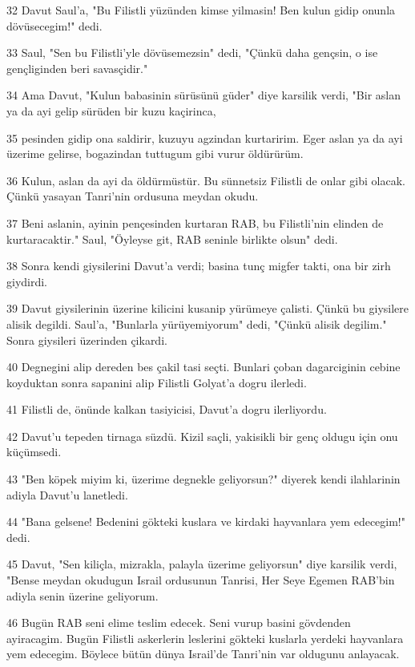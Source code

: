 \par 32 Davut Saul'a, "Bu Filistli yüzünden kimse yilmasin! Ben kulun gidip onunla dövüsecegim!" dedi.
\par 33 Saul, "Sen bu Filistli'yle dövüsemezsin" dedi, "Çünkü daha gençsin, o ise gençliginden beri savasçidir."
\par 34 Ama Davut, "Kulun babasinin sürüsünü güder" diye karsilik verdi, "Bir aslan ya da ayi gelip sürüden bir kuzu kaçirinca,
\par 35 pesinden gidip ona saldirir, kuzuyu agzindan kurtaririm. Eger aslan ya da ayi üzerime gelirse, bogazindan tuttugum gibi vurur öldürürüm.
\par 36 Kulun, aslan da ayi da öldürmüstür. Bu sünnetsiz Filistli de onlar gibi olacak. Çünkü yasayan Tanri'nin ordusuna meydan okudu.
\par 37 Beni aslanin, ayinin pençesinden kurtaran RAB, bu Filistli'nin elinden de kurtaracaktir." Saul, "Öyleyse git, RAB seninle birlikte olsun" dedi.
\par 38 Sonra kendi giysilerini Davut'a verdi; basina tunç migfer takti, ona bir zirh giydirdi.
\par 39 Davut giysilerinin üzerine kilicini kusanip yürümeye çalisti. Çünkü bu giysilere alisik degildi. Saul'a, "Bunlarla yürüyemiyorum" dedi, "Çünkü alisik degilim." Sonra giysileri üzerinden çikardi.
\par 40 Degnegini alip dereden bes çakil tasi seçti. Bunlari çoban dagarciginin cebine koyduktan sonra sapanini alip Filistli Golyat'a dogru ilerledi.
\par 41 Filistli de, önünde kalkan tasiyicisi, Davut'a dogru ilerliyordu.
\par 42 Davut'u tepeden tirnaga süzdü. Kizil saçli, yakisikli bir genç oldugu için onu küçümsedi.
\par 43 "Ben köpek miyim ki, üzerime degnekle geliyorsun?" diyerek kendi ilahlarinin adiyla Davut'u lanetledi.
\par 44 "Bana gelsene! Bedenini gökteki kuslara ve kirdaki hayvanlara yem edecegim!" dedi.
\par 45 Davut, "Sen kiliçla, mizrakla, palayla üzerime geliyorsun" diye karsilik verdi, "Bense meydan okudugun Israil ordusunun Tanrisi, Her Seye Egemen RAB'bin adiyla senin üzerine geliyorum.
\par 46 Bugün RAB seni elime teslim edecek. Seni vurup basini gövdenden ayiracagim. Bugün Filistli askerlerin leslerini gökteki kuslarla yerdeki hayvanlara yem edecegim. Böylece bütün dünya Israil'de Tanri'nin var oldugunu anlayacak.
